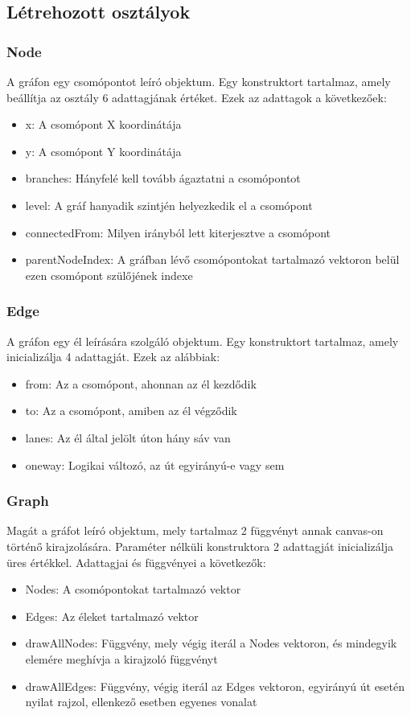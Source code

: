 \subsection{Létrehozott osztályok}
\subsubsection{Node}
A gráfon egy csomópontot leíró objektum. Egy konstruktort tartalmaz, amely beállítja az osztály 6 adattagjának értéket. Ezek az adattagok a következőek:
\begin{itemize}
\item x: A csomópont X koordinátája
\item y: A csomópont Y koordinátája
\item branches: Hányfelé kell tovább ágaztatni a csomópontot
\item level: A gráf hanyadik szintjén helyezkedik el a csomópont
\item connectedFrom: Milyen irányból lett kiterjesztve a csomópont
\item parentNodeIndex: A gráfban lévő csomópontokat tartalmazó vektoron belül ezen csomópont szülőjének indexe
\end{itemize}
\subsubsection{Edge}
A gráfon egy él leírására szolgáló objektum. Egy konstruktort tartalmaz, amely inicializálja 4 adattagját. Ezek az alábbiak:
\begin{itemize}
\item from: Az a csomópont, ahonnan az él kezdődik
\item to: Az a csomópont, amiben az él végződik
\item lanes: Az él által jelölt úton hány sáv van
\item oneway: Logikai változó, az út egyirányú-e vagy sem
\end{itemize}
\subsubsection{Graph}
Magát a gráfot leíró objektum, mely tartalmaz 2 függvényt annak canvas-on történő kirajzolására. Paraméter nélküli konstruktora 2 adattagját inicializálja üres értékkel. Adattagjai és függvényei a következők:
\begin{itemize}
\item Nodes: A csomópontokat tartalmazó vektor
\item Edges: Az éleket tartalmazó vektor
\item drawAllNodes: Függvény, mely végig iterál a Nodes vektoron, és mindegyik elemére meghívja a kirajzoló függvényt
\item drawAllEdges: Függvény, végig iterál az Edges vektoron, egyirányú út esetén nyilat rajzol, ellenkező esetben egyenes vonalat
\end{itemize}
